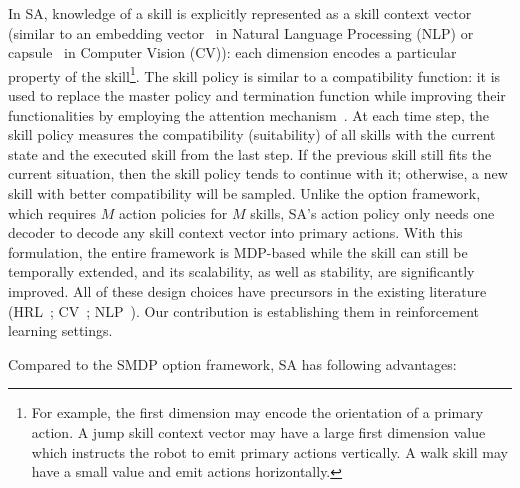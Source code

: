 In SA, knowledge of a skill is explicitly represented as a skill
context vector (similar to an embedding
vector~\cite{vaswani2017attention} in Natural Language Processing
(NLP) or capsule~\cite{sabour2017dynamic} in Computer Vision
(CV)): each dimension encodes a particular property of the
skill\footnote{For example, the first dimension may encode the
  orientation of a primary action. A jump skill context vector
  may have a large first dimension value which instructs the
  robot to emit primary actions vertically. A walk skill may have
  a small value and emit actions horizontally.}. The skill policy
is similar to a compatibility function: it is used to replace the
master policy and termination function while improving their
functionalities by employing the attention
mechanism~\cite{vaswani2017attention}. At each time step, the
skill policy measures the compatibility (suitability) of all
skills with the current state and the executed skill from the
last step. If the previous skill still fits the current
situation, then the skill policy tends to continue with it;
otherwise, a new skill with better compatibility will be sampled.
Unlike the option framework, which requires $M$ action policies
for $M$ skills, SA's action policy only needs one decoder to
decode any skill context vector into primary actions. With this
formulation, the entire framework is MDP-based while the skill
can still be temporally extended, and its scalability, as well as
stability, are significantly improved. %
All of these design choices have precursors in the existing
literature
(HRL~\cite{sutton1999between,bacon2018temporal,zhang2019dac};
CV~\cite{kosiorek2019stacked}; NLP~\cite{vaswani2017attention}).
Our contribution is establishing them in reinforcement learning
settings.

Compared to the SMDP option framework, SA has following
advantages:

